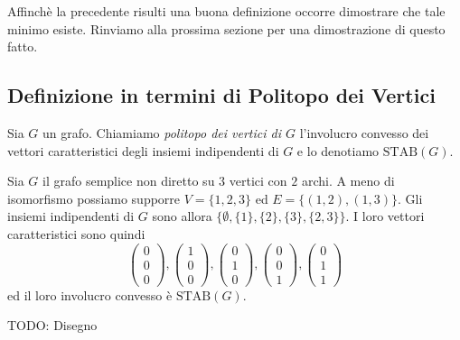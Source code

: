 Affinchè la precedente risulti una buona definizione occorre dimostrare che tale minimo esiste. Rinviamo alla prossima sezione per una dimostrazione di questo fatto.

\subsection{Definizione in termini di Politopo dei Vertici} 
\begin{definition}
	Sia \(G\) un grafo. Chiamiamo \emph{politopo dei vertici di \(G\)} l'involucro convesso dei vettori caratteristici degli insiemi indipendenti di \(G\) e lo denotiamo \(\text{STAB}(G)\). 
\end{definition}
\begin{example}
	Sia \(G\) il grafo semplice non diretto su \(3\) vertici con \(2\) archi. A meno di isomorfismo possiamo supporre \(V=\{1,2,3\}\) ed \(E=\{(1,2),(1,3)\}\). Gli insiemi indipendenti di \(G\) sono allora \(\{\emptyset , \{1\}, \{2\}, \{3\}, \{2,3\}\}\). I loro vettori caratteristici sono quindi
	\[ 
	\begin{pmatrix}
		0\\0\\0 
	\end{pmatrix}
	, 
	\begin{pmatrix}
		1\\0\\0 
	\end{pmatrix}
	, 
	\begin{pmatrix}
		0\\1\\0 
	\end{pmatrix}
	, 
	\begin{pmatrix}
		0\\0\\1 
	\end{pmatrix}
	, 
	\begin{pmatrix}
		0\\1\\1 
	\end{pmatrix}
	\]
	ed il loro involucro convesso è \(\text{STAB}(G)\).
	
	TODO: Disegno 
\end{example}

